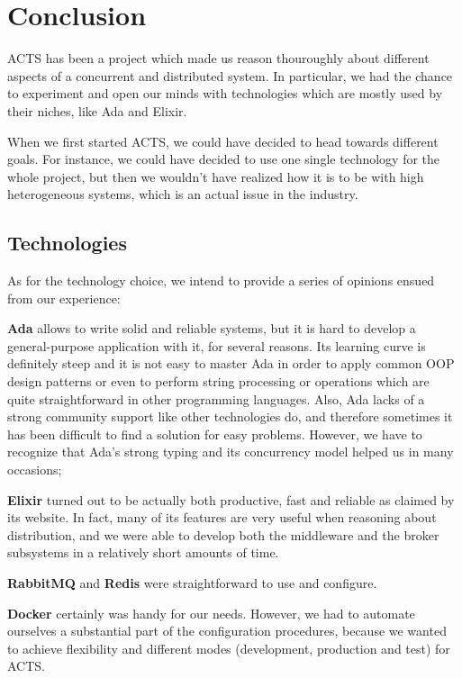 \section{Conclusion}

ACTS has been a project which made us reason thouroughly about different
aspects of a concurrent and distributed system.
In particular, we had the chance to experiment and open our minds with
technologies which are mostly used by their niches, like Ada and Elixir.

When we first started ACTS, we could have decided to head towards different
goals. For instance, we could have decided to use one single technology for the
whole project, but then we wouldn't have realized how it is to be with high
heterogeneous systems, which is an actual issue in the industry.

\subsection{Technologies}

As for the technology choice, we intend to provide a series of opinions ensued
from our experience:

\noindent\textbf{Ada} allows to write solid and reliable systems, but it is
hard to develop a general-purpose application with it, for several reasons. Its
learning curve is definitely steep and it is not easy to master Ada in order
to apply common OOP design patterns or even to perform string processing or
operations which are quite straightforward in other programming languages.
Also, Ada lacks of a strong community support like other technologies do, and
therefore sometimes it has been difficult to find a solution for easy
problems. However, we have to recognize that Ada's strong typing and its
concurrency model helped us in many occasions;

\noindent\textbf{Elixir} turned out to be actually both productive, fast and
reliable as claimed by its website. In fact, many of its features are very
useful when reasoning about distribution, and we were able to develop both the
middleware and the broker subsystems in a relatively short amounts of time.

\noindent\textbf{RabbitMQ} and \textbf{Redis} were straightforward to use and
configure.

\noindent\textbf{Docker} certainly was handy for our needs. However, we had to
automate ourselves a substantial part of the configuration procedures, because
we wanted to achieve flexibility and different modes (development, production
and test) for ACTS.

